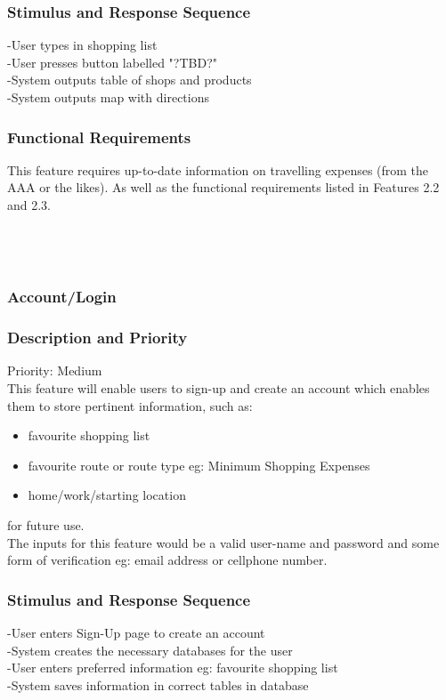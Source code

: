 \documentclass[12pt]{article}
\begin{document}
 \subsubsection*{Stimulus and Response Sequence}
 -User types in shopping list\\
-User presses button labelled "?TBD?"\\
-System outputs table of shops and products\\
-System outputs map with directions\\
 \subsubsection*{Functional Requirements}
 This feature requires up-to-date information on travelling expenses (from the AAA or the likes).
 As well as the functional requirements listed in Features 2.2 and 2.3.
 \\
 \\
 \\
 \\
 \subsubsection{Account/Login}
\subsubsection*{Description and Priority}
 Priority: Medium\\
 This feature will enable users to sign-up and create an account which enables them to store pertinent information, such as:\begin{itemize}
  \item favourite shopping list
  \item favourite route or route type eg: Minimum Shopping Expenses
  \item home/work/starting location
\end{itemize}
for future use. \\
The inputs for this feature would be a valid user-name and password and some form of verification eg: email address or cellphone number. 
      
 \subsubsection*{Stimulus and Response Sequence}
-User enters Sign-Up page to create an account \\
-System creates the necessary databases for the user\\
-User enters preferred information eg: favourite shopping list\\
-System saves information in correct tables in database
\end{document}
